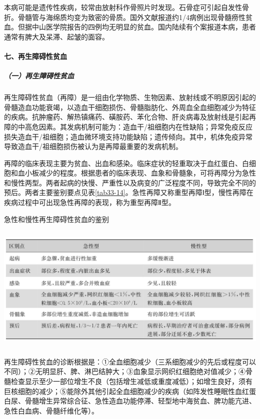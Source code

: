 本病可能是遗传性疾病，较常由放射科作骨照片时发现。石骨症可引起自发性骨折。骨髓管与海绵质均变为致密的骨质。国外文献报道约1/4病例出现骨髓痨性贫血。但据中山医学院报告的四例均无明显的贫血。国内陆续有个案报道本病，患者通常有脾大及呆滞、起皱的面容。

\paragraph{七、再生障碍性贫血}

\subparagraph{（一）再生障碍性贫血}

再生障碍性贫血（再障）是一组由化学物质、生物因素、放射线或不明原因引起的骨髓造血功能衰竭，以造血干细胞损伤、骨髓脂肪化、外周血全血细胞减少为特征的疾病。抗肿瘤药、解热镇痛药、磺胺药、苯化合物、肝炎病毒及放射线是引起再障的中高危因素。其发病机制可能为：造血干/祖细胞内在性缺陷；异常免疫反应损失造血干/祖细胞；造血微环境支持功能缺陷；遗传倾向。其中，机体免疫异常导致造血干/祖细胞损伤被认为是再障最重要的发病机制。

再障的临床表现主要为贫血、出血和感染。临床症状的轻重取决于血红蛋白、白细胞和血小板减少的程度。根据患者的临床表现、血象和骨髓象，可将再障分为急性和慢性两型。两者起病的快慢、严重性以及病变的广泛程度不同，导致完全不同的预后。两者主要鉴别要点见表\ref{tab33-14}。急性再障又称重型再障Ⅰ型，慢性再障在疾病过程中可出现急性再障的表现，称为重型再障Ⅱ型。

\begin{table}[htbp]
\centering
\caption{急性和慢性再生障碍性贫血的鉴别}
\label{tab33-14}
\includegraphics[width=5.9375in,height=2.42708in]{./images/Image00191.jpg}
\end{table}

再生障碍性贫血的诊断根据是：①全血细胞减少（三系细胞减少的先后或程度可以不同）；②无明显肝、脾、淋巴结肿大；③血象显示网织红细胞绝对值减少；④骨髓检查显示至少一部位增生不良（包括增生减低或重度减低）；如增生良好，须有巨核细胞的减少；⑤能除外其他引起全血细胞减少的疾病（如阵发性睡眠性血红蛋白尿、骨髓增生异常综合征、急性造血功能停滞、轻型地中海贫血、脾功能亢进、急性白血病、骨髓纤维化等）。

